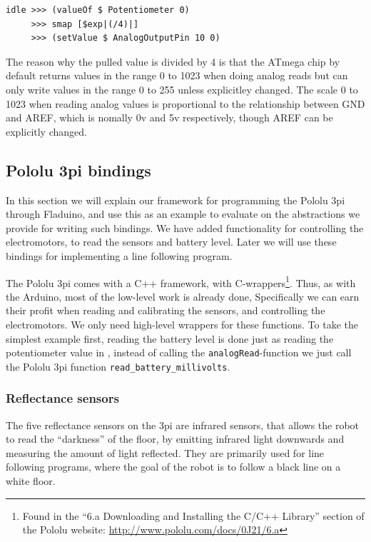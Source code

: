 \documentclass[a4paper, oneside, final]{memoir}
\let\fref\undefined
\begin{document}
\begin{verbatim}
idle >>> (valueOf $ Potentiometer 0) 
     >>> smap [$exp|(/4)|] 
     >>> (setValue $ AnalogOutputPin 10 0)
\end{verbatim}

The reason why the pulled value is divided by 4 is that the ATmega
chip by default returns values in the range 0 to 1023 when doing
analog reads but can only write values in the range 0 to 255 unless
explicitley changed. The scale 0 to 1023 when reading analog values is
proportional to the relationship between GND and AREF, which is
nomally 0v and 5v respectively, though AREF can be explicitly changed.


\subsection{Pololu 3pi bindings}
\label{sec:3pi bindings}
In this section we will explain our framework for programming the
Pololu 3pi through Fladuino, and use this as an example to evaluate on
the abstractions we provide for writing such bindings. We have added
functionality for controlling the electromotors, to read the sensors
and battery level. Later we will use these bindings for implementing a
line following program.

The Pololu 3pi comes with a C++ framework, with
C-wrappers\footnote{Found in the ``6.a Downloading and Installing the
  C/C++ Library'' section of the Pololu website:
  \url{http://www.pololu.com/docs/0J21/6.a}}. Thus, as with the
Arduino, most of the low-level work is already done, Specifically we
can earn their profit when reading and calibrating the sensors, and
controlling the electromotors. We only need high-level wrappers for
these functions.  To take the simplest example first, reading the
battery level is done just as reading the potentiometer value in
\fref{sec:potentiometer device}, instead of calling the
\verb|analogRead|-function we just call the Pololu 3pi function
\verb|read_battery_millivolts|.

\subsubsection{Reflectance sensors}
The five reflectance sensors on the 3pi are infrared sensors, that
allows the robot to read the ``darkness'' of the floor, by emitting
infrared light downwards and measuring the amount of light
reflected. They are primarily used for line following programs, where
the goal of the robot is to follow a black line on a white floor.
\end{document}
